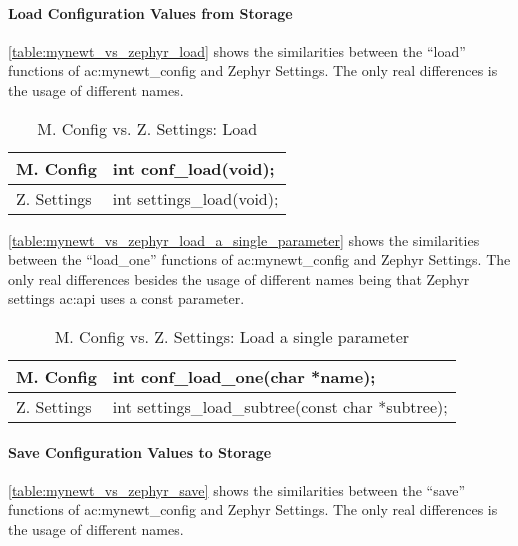 \paragraph*{Load Configuration Values from Storage}\mbox{}

\autoref{table:mynewt_vs_zephyr_load} shows the similarities between the ``load'' functions of \gls{ac:mynewt_config} and Zephyr Settings.
The only real differences is the usage of different names.

\begin{table}[H]
      \begin{tabular}{ | l | l | }
            \hline
            M. Config   & int conf\_load(void);
            \\ \hline
            Z. Settings & int settings\_load(void);
            \\
            \hline
      \end{tabular}
      \caption{M. Config vs. Z. Settings: Load}
      \label{table:mynewt_vs_zephyr_load}
\end{table}

\autoref{table:mynewt_vs_zephyr_load_a_single_parameter} shows the similarities between the ``load\_one'' functions of \gls{ac:mynewt_config} and Zephyr Settings.
The only real differences besides the usage of different names being that Zephyr settings \gls{ac:api} uses a const parameter.

\begin{table}[H]
      \begin{tabular}{ | l | l | }
            \hline
            M. Config   & int conf\_load\_one(char *name);
            \\ \hline
            Z. Settings & int settings\_load\_subtree(const char *subtree);
            \\
            \hline
      \end{tabular}
      \caption{M. Config vs. Z. Settings: Load a single parameter}
      \label{table:mynewt_vs_zephyr_load_a_single_parameter}
\end{table}

\paragraph*{Save Configuration Values to Storage}\mbox{}

\autoref{table:mynewt_vs_zephyr_save} shows the similarities between the ``save'' functions of \gls{ac:mynewt_config} and Zephyr Settings.
The only real differences is the usage of different names.

